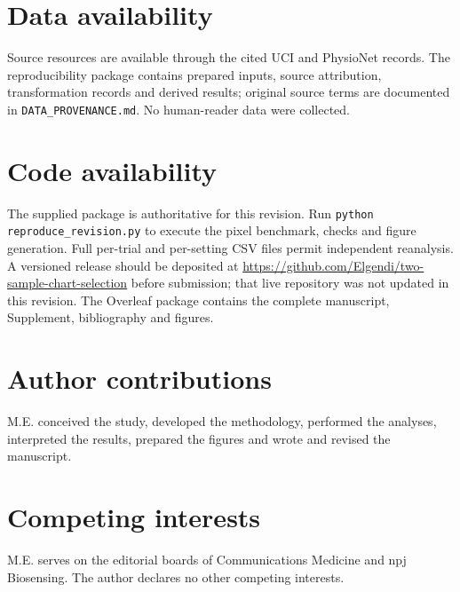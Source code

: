 \documentclass[11pt]{article}
\begin{document}
\section*{Data availability}
Source resources are available through the cited UCI and PhysioNet records. The reproducibility package contains prepared inputs, source attribution, transformation records and derived results; original source terms are documented in \texttt{DATA\_PROVENANCE.md}. No human-reader data were collected.
\section*{Code availability}
The supplied package is authoritative for this revision. Run \texttt{python reproduce\_revision.py} to execute the pixel benchmark, checks and figure generation. Full per-trial and per-setting CSV files permit independent reanalysis. A versioned release should be deposited at \url{https://github.com/Elgendi/two-sample-chart-selection} before submission; that live repository was not updated in this revision. The Overleaf package contains the complete manuscript, Supplement, bibliography and figures.
\section*{Author contributions}
M.E. conceived the study, developed the methodology, performed the analyses, interpreted the results, prepared the figures and wrote and revised the manuscript.
\section*{Competing interests}
M.E. serves on the editorial boards of Communications Medicine and npj Biosensing. The author declares no other competing interests.
\begingroup\footnotesize\setlength{\bibsep}{1pt}\endgroup
\end{document}
